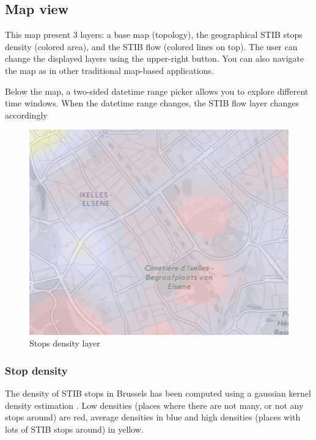 \documentclass[11pt]{article}%
\begin{document}
\subsection{Map view}

This map present 3 layers: a base map (topology), the geographical STIB stops density (colored area), and the STIB flow (colored lines on top). The user can change the displayed layers using the upper-right button. You can also navigate the map as in other traditional map-based applications.

Below the map, a two-sided datetime range picker allows you to explore different time windows. When the datetime range changes, the STIB flow layer changes accordingly

\begin{minipage}{0.3\textwidth}
  \begin{figure}[H]
    \includegraphics[width=\textwidth]{images/area.png}
    \caption{Stops density layer}
  \end{figure}
\end{minipage}\hfill
\begin{minipage}{0.6\textwidth}
  \subsubsection{Stop density}
  The density of STIB stops in Brussels has been computed using a gaussian kernel density estimation \cite{kdewiki}. Low densities (places where there are not many, or not any stops around) are red, average densities in blue and high densities (places with lots of STIB stops around) in yellow.
\end{minipage}
\end{document}
